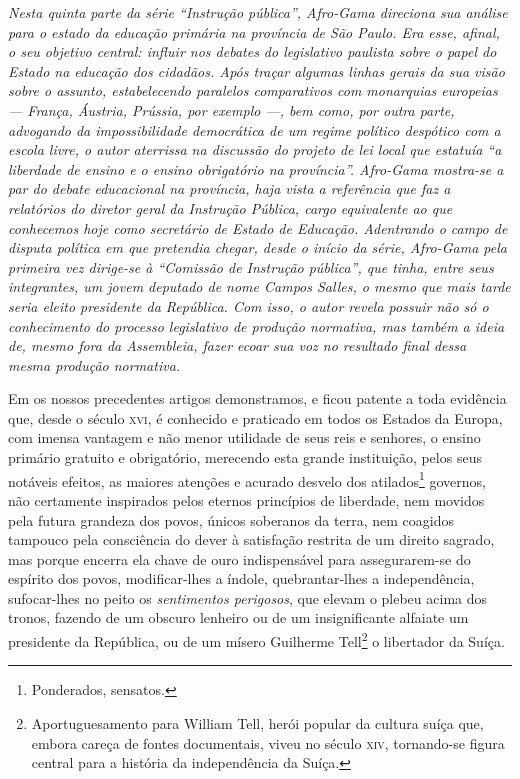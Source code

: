 \begin{didascalia}\itshape
Nesta quinta parte da série ``Instrução pública'', Afro-Gama
direciona sua análise para o estado da educação primária na província de
São Paulo. Era esse, afinal, o seu objetivo central: influir nos debates
do legislativo paulista sobre o papel do Estado na educação dos
cidadãos. Após traçar algumas linhas gerais da sua visão sobre o
assunto, estabelecendo paralelos comparativos com monarquias europeias
--- França, Áustria, Prússia, por exemplo ---, bem como, por outra parte,
advogando da impossibilidade democrática de um regime político despótico
com a escola livre, o autor aterrissa na discussão do projeto de lei
local que estatuía ``a liberdade de ensino e o ensino obrigatório na
província''. Afro-Gama mostra-se a par do debate educacional na
província, haja vista a referência que faz a relatórios do diretor geral
da Instrução Pública, cargo equivalente ao que conhecemos hoje como
secretário de Estado de Educação. Adentrando o campo de disputa política
em que pretendia chegar, desde o início da série, Afro-Gama pela
primeira vez dirige-se à ``Comissão de Instrução pública'', que tinha,
entre seus integrantes, um jovem deputado de nome Campos Salles, o mesmo
que mais tarde seria eleito presidente da República. Com isso, o autor
revela possuir não só o conhecimento do processo legislativo de produção
normativa, mas também a ideia de, mesmo fora da Assembleia, fazer ecoar
sua voz no resultado final dessa mesma produção normativa.
\end{didascalia}



Em os nossos precedentes artigos demonstramos, e ficou patente a toda
evidência que, desde o século \textsc{xvi}, é conhecido e praticado em todos os
Estados da Europa, com imensa vantagem e não menor utilidade de seus
reis e senhores, o ensino primário gratuito e obrigatório, merecendo
esta grande instituição, pelos seus notáveis efeitos, as maiores
atenções e acurado desvelo dos atilados\footnote{Ponderados, sensatos.}
governos, não certamente inspirados pelos eternos princípios de
liberdade, nem movidos pela futura grandeza dos povos, únicos soberanos
da terra, nem coagidos tampouco pela consciência do dever à satisfação
restrita de um direito sagrado, mas porque encerra ela chave de ouro
indispensável para assegurarem-se do espírito dos povos, modificar-lhes
a índole, quebrantar-lhes a independência, sufocar-lhes no peito os
\emph{sentimentos perigosos}, que elevam o plebeu acima dos tronos,
fazendo de um obscuro lenheiro ou de um insignificante alfaiate um
presidente da República, ou de um mísero Guilherme Tell\footnote{
  Aportuguesamento para William Tell, herói popular da cultura suíça
  que, embora careça de fontes documentais, viveu no século \textsc{xiv},
  tornando-se figura central para a história da independência da Suíça.}
o libertador da Suíça.

